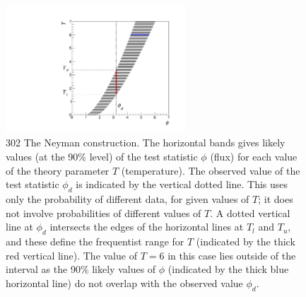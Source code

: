 \begin{figure}[hbt!]
    \centering
    \includegraphics[width=0.6\textwidth]{figures/Intervals/neyman.pdf}
    \caption{302 The Neyman construction.  The horizontal bands gives likely values (at the 90\%
 level) of the test statistic $\phi$ (flux) for each value of the theory parameter $T$ (temperature).
 The  observed value of the test statistic $\phi_{d}$ is indicated by the vertical dotted line.
 This uses only the probability of different data, for given values of $T$;
 it does not involve probabilities of different values of $T$.
 A dotted vertical line at $\phi_{d}$ intersects
 the edges of the horizontal lines at $T_l$ and $T_u$, and these define the
 frequentist range for $T$ (indicated by the thick red vertical line). The value of $T=6$ in this case lies
 outside of the interval as the 90\% likely values of $\phi$ (indicated by the thick blue horizontal line) do not overlap with the observed value $\phi_{d}$. }
    \label{fig:neyman}
\end{figure}

